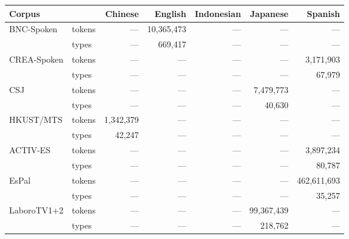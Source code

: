 \begin{tabular}{llrrrrr}
\toprule
Corpus &  & Chinese & English & Indonesian & Japanese & Spanish \\
\midrule
\multirow[c]{2}{*}{BNC-Spoken} & tokens & {---} & 10,365,473 & {---} & {---} & {---} \\
 & \cellcolor[HTML]{EEEEEE} types & \cellcolor[HTML]{EEEEEE} {---} & \cellcolor[HTML]{EEEEEE} 669,417 & \cellcolor[HTML]{EEEEEE} {---} & \cellcolor[HTML]{EEEEEE} {---} & \cellcolor[HTML]{EEEEEE} {---} \\
\multirow[c]{2}{*}{CREA-Spoken} & tokens & {---} & {---} & {---} & {---} & 3,171,903 \\
 & \cellcolor[HTML]{EEEEEE} types & \cellcolor[HTML]{EEEEEE} {---} & \cellcolor[HTML]{EEEEEE} {---} & \cellcolor[HTML]{EEEEEE} {---} & \cellcolor[HTML]{EEEEEE} {---} & \cellcolor[HTML]{EEEEEE} 67,979 \\
\multirow[c]{2}{*}{CSJ} & tokens & {---} & {---} & {---} & 7,479,773 & {---} \\
 & \cellcolor[HTML]{EEEEEE} types & \cellcolor[HTML]{EEEEEE} {---} & \cellcolor[HTML]{EEEEEE} {---} & \cellcolor[HTML]{EEEEEE} {---} & \cellcolor[HTML]{EEEEEE} 40,630 & \cellcolor[HTML]{EEEEEE} {---} \\
\multirow[c]{2}{*}{HKUST/MTS} & tokens & 1,342,379 & {---} & {---} & {---} & {---} \\
 & \cellcolor[HTML]{EEEEEE} types & \cellcolor[HTML]{EEEEEE} 42,247 & \cellcolor[HTML]{EEEEEE} {---} & \cellcolor[HTML]{EEEEEE} {---} & \cellcolor[HTML]{EEEEEE} {---} & \cellcolor[HTML]{EEEEEE} {---} \\
\multirow[c]{2}{*}{ACTIV-ES} & tokens & {---} & {---} & {---} & {---} & 3,897,234 \\
 & \cellcolor[HTML]{EEEEEE} types & \cellcolor[HTML]{EEEEEE} {---} & \cellcolor[HTML]{EEEEEE} {---} & \cellcolor[HTML]{EEEEEE} {---} & \cellcolor[HTML]{EEEEEE} {---} & \cellcolor[HTML]{EEEEEE} 80,787 \\
\multirow[c]{2}{*}{EsPal} & tokens & {---} & {---} & {---} & {---} & 462,611,693 \\
 & \cellcolor[HTML]{EEEEEE} types & \cellcolor[HTML]{EEEEEE} {---} & \cellcolor[HTML]{EEEEEE} {---} & \cellcolor[HTML]{EEEEEE} {---} & \cellcolor[HTML]{EEEEEE} {---} & \cellcolor[HTML]{EEEEEE} 35,257 \\
\multirow[c]{2}{*}{LaboroTV1+2} & tokens & {---} & {---} & {---} & 99,367,439 & {---} \\
 & \cellcolor[HTML]{EEEEEE} types & \cellcolor[HTML]{EEEEEE} {---} & \cellcolor[HTML]{EEEEEE} {---} & \cellcolor[HTML]{EEEEEE} {---} & \cellcolor[HTML]{EEEEEE} 218,762 & \cellcolor[HTML]{EEEEEE} {---} \\

\end{tabular}
